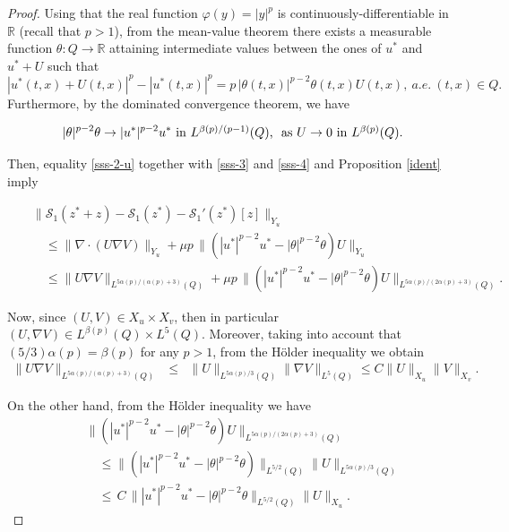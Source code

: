 \documentclass[11pt,reqno]{amsart}%
\numberwithin{equation}{section}
\begin{document}
{\begin{proof}
Using that the real function  $\varphi(y)= |y|^p$ is continuously-differentiable in $\mathbb{R}$ (recall that $p>1$), from the mean-value theorem  there exists a measurable function $\theta:Q\rightarrow \mathbb{R}$ attaining intermediate values between the ones of $u^*$ and $u^*+U$ such that
\begin{equation}\label{sss-4}
|u^*(t,x)+U(t,x)|^p-|u^*(t,x)|^p=  p \, |\theta(t,x)|^{p-2}\theta(t,x) U(t,x),\ a.e.\ (t,x)\in Q.
\end{equation}
%
Furthermore, by the dominated convergence theorem, we have 
%

\begin{equation}\label{sss-4-1}
|\theta|^{p-2}\theta\to |u^*|^{p-2} u^* \hbox{ in $L^{\beta(p)/(p-1)}(Q)$, }
\mbox{ as } U\to 0 \hbox{ in $L^{\beta(p)}(Q)$}.
\end{equation}

Then, equality \eqref{sss-2-u} together with \eqref{sss-3}
 and \eqref{sss-4}  and Proposition \ref{ident}
imply

\begin{equation}\label{sss-5}
\begin{array}{rcl}
&&\|\mathcal{S}_1(z^*+z)-\mathcal{S}_1(z^*)-\mathcal{S}_1'(z^*)[z]\|_{Y_u}
\\
 && \quad \le  \|\nabla\cdot(U\nabla V)\|_{Y_u}
 +\mu p\,\|( |u^*|^{p-2} u^* - |\theta|^{p-2}\theta )U\|_{Y_u}\\
 &&\quad 
 \le \|U\nabla V\|_{L^{5\alpha(p)/(\alpha(p)+3)}(Q)}
 +\mu p\,\|( |u^*|^{p-2} u^* - |\theta|^{p-2}\theta )U\|_{L^{5\alpha(p)/(2\alpha(p)+3)}(Q)}.
\end{array}
\end{equation}

 Now, since $(U, V)\in X_u\times X_v$, then in particular $(U,\nabla V)\in L^{\beta(p)}(Q)\times L^5(Q)$. 
 Moreover, taking into account that $(5/3)\alpha(p)=\beta(p)$ for any $p>1$, 
 from the H\"older inequality we obtain
\begin{eqnarray}
\|U\nabla V \|_{ L^{5\alpha(p)/(\alpha(p)+3)}(Q)}
&\leq& 
\|U\|_{L^{5\alpha(p)/3}(Q)}\|\nabla V\|_{L^{5}(Q)}
\le C\|U\|_{{X}_{ u}}\|V\|_{{X}_{ v}}.
\label{sss-6}
\end{eqnarray}


On the other hand, 
from the H\"older inequality we have
%
\begin{eqnarray}
&&
\|( |u^*|^{p-2} u^* - |\theta|^{p-2}\theta )U\|_{L^{5\alpha(p)/(2\alpha(p)+3)}(Q)}
 \nonumber \\
&& \quad \le \|( |u^*|^{p-2} u^* - |\theta|^{p-2}\theta )\|_{L^{5/2}(Q)} 
 \|U\|_{L^{5\alpha(p)/3}(Q)}
\nonumber \\
 &&\quad \le   \,  C \,  \| |u^*|^{p-2} u^* - |\theta|^{p-2}\theta \|_{L^{5/2}(Q)}\|U\|_{X_u}.
\label{sss-6-1}
\end{eqnarray}


\end{proof}}
\end{document}
